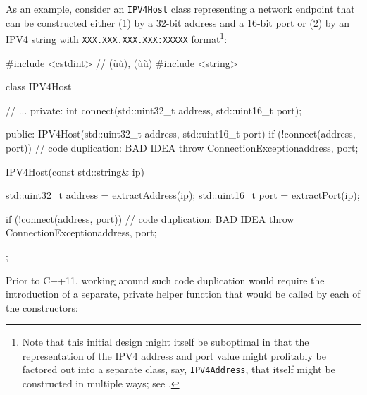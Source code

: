 As an example, consider an \lstinline!IPV4Host! class representing a
network endpoint that can be constructed either (1) by a 32-bit address
and a 16-bit port or (2) by an IPV4 string with
\lstinline!XXX.XXX.XXX.XXX:XXXXX! format{\cprotect\footnote{Note that
this initial design might itself be suboptimal in that the
representation of the IPV4 address and port value might profitably be
factored out into a separate  class, say,
\lstinline!IPV4Address!, that itself might be constructed in multiple ways;
  see .}}:

\begin{emcppslisting}[language=C++]
#include <cstdint> // (ù{}ù), (ù{}ù)
#include <string>

class IPV4Host
{
     // ...
private:                                                                      
    int connect(std::uint32_t address, std::uint16_t port);

public:
    IPV4Host(std::uint32_t address, std::uint16_t port)
    {
        if (!connect(address, port))  // code duplication: BAD IDEA
        {
            throw ConnectionException{address, port};
        }
    }

    IPV4Host(const std::string& ip)
    {
        std::uint32_t address = extractAddress(ip);
        std::uint16_t port = extractPort(ip);

        if (!connect(address, port))  // code duplication: BAD IDEA
        {
            throw ConnectionException{address, port};
        }
    }
};
\end{emcppslisting}
    
\noindent Prior to C++11, working around such code duplication would require the
introduction of a separate, private helper function that
would be called by each of the constructors:

